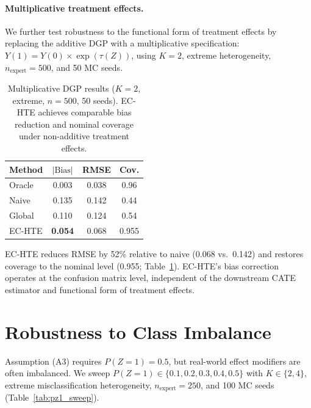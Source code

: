 \paragraph{Multiplicative treatment effects.}
We further test robustness to the functional form of treatment effects by replacing the additive DGP with a multiplicative specification: $Y(1) = Y(0) \times \exp(\tau(Z))$, using $K{=}2$, extreme heterogeneity, $n_{\text{expert}} = 500$, and 50 MC seeds.

\begin{table}[t]
\centering
\caption{Multiplicative DGP results ($K{=}2$, extreme, $n{=}500$, 50 seeds). EC-HTE achieves comparable bias reduction and nominal coverage under non-additive treatment effects.}
\label{tab:multiplicative}
\small
\begin{tabular}{lccc}
\toprule
Method & $|\text{Bias}|$ & RMSE & Cov. \\
\midrule
Oracle & 0.003 & 0.038 & 0.96 \\
Naive & 0.135 & 0.142 & 0.44 \\
Global & 0.110 & 0.124 & 0.54 \\
EC-HTE & \textbf{0.054} & 0.068 & 0.955 \\
\bottomrule
\end{tabular}
\end{table}

EC-HTE reduces RMSE by 52\% relative to naive (0.068 vs.\ 0.142) and restores coverage to the nominal level (0.955; Table~\ref{tab:multiplicative}).
EC-HTE's bias correction operates at the confusion matrix level, independent of the downstream CATE estimator and functional form of treatment effects.

\section{Robustness to Class Imbalance}
\label{app:classimbalance}

Assumption (A3) requires $P(Z{=}1) = 0.5$, but real-world effect modifiers are often imbalanced.
We sweep $P(Z{=}1) \in \{0.1, 0.2, 0.3, 0.4, 0.5\}$ with $K \in \{2,4\}$, extreme misclassification heterogeneity, $n_{\text{expert}}{=}250$, and 100 MC seeds (Table~\ref{tab:pz1_sweep}).


